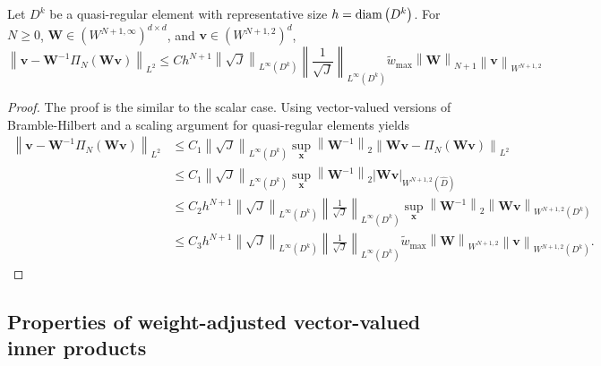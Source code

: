 \documentclass{siamart0216}
\newcommand{\nor}[1]{\left\| #1 \right\|}
\newcommand{\LRp}[1]{\left( #1 \right)}
\newcommand{\LRb}[1]{\left| #1 \right|}
\newcommand{\Dhat}{\widehat{D}}
\newcommand{\LinfDk}{L^{\infty}\LRp{D^k}}
\begin{document}
\begin{theorem}
Let $D^k$ be a quasi-regular element with representative size $h = {\rm diam}\LRp{D^k}$. For $N \geq 0$, $\bm{W} \in \LRp{W^{N+1,\infty}}^{d\times d}$, and $\bm{v}\in \LRp{W^{N+1,2}}^d$, 
\[
\nor{\bm{v} - \bm{W}^{-1}\Pi_N\LRp{\bm{W}\bm{v}}}_{L^2} \leq Ch^{N+1} \nor{{\sqrt{J}}}_{\LinfDk}\nor{\frac{1}{\sqrt{J}}}_{\LinfDk}\tilde{w}_{\max}\nor{\bm{W}}_{N+1} \nor{\bm{v}}_{W^{N+1,2}}
\]
\label{thm:Wproj}
\end{theorem}
\begin{proof}
The proof is the similar to the scalar case.  Using vector-valued versions of Bramble-Hilbert and a scaling argument for quasi-regular elements yields
\begin{align*}
\nor{\bm{v} - \bm{W}^{-1}\Pi_N\LRp{\bm{W}\bm{v}}}_{L^2} &\leq C_1 \nor{\sqrt{J}}_{\LinfDk} \sup_{\bm{x}}\nor{\bm{W}^{-1}}_{2} \nor{\bm{W}\bm{v} - \Pi_N\LRp{\bm{W}\bm{v}}}_{L^2}\\
&\leq C_1 \nor{{\sqrt{J}}}_{\LinfDk} \sup_{\bm{x}}\nor{\bm{W}^{-1}}_{2} \LRb{\bm{W}\bm{v}}_{W^{N+1,2}\LRp{\Dhat}}\\
&\leq C_2 h^{N+1}\nor{{\sqrt{J}}}_{\LinfDk}\nor{\frac{1}{\sqrt{J}}}_{\LinfDk} \sup_{\bm{x}}\nor{\bm{W}^{-1}}_{2} \nor{\bm{W}\bm{v}}_{W^{N+1,2}\LRp{D^k}}\\
&\leq C_3 h^{N+1}\nor{{\sqrt{J}}}_{\LinfDk}\nor{\frac{1}{\sqrt{J}}}_{\LinfDk} \tilde{w}_{\max} \nor{\bm{W}}_{W^{N+1,2}}\nor{\bm{v}}_{W^{N+1,2}\LRp{D^k}}.
\end{align*}
\end{proof}


\subsection{Properties of weight-adjusted vector-valued inner products}
\end{document}
